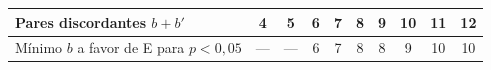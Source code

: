 \begin{tabular}{@{}lccccccccc@{}}
\toprule
Pares discordantes $b+b'$ & 4 & 5 & 6 & 7 & 8 & 9 & 10 & 11 & 12\\
\midrule
Mínimo $b$ a favor de E para $p<0{,}05$ & --- & --- & 6 & 7 & 8 & 8 & 9 & 10 & 10\\
\bottomrule
\end{tabular}

